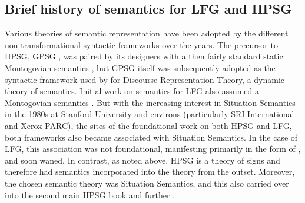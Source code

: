 \subsection{Brief history of semantics for LFG and HPSG}
\label{sec:background}

%
%
%

Various theories of semantic representation have been adopted by the different non-transformational syntactic frameworks over the years.  
The precursor to HPSG, GPSG \citep{GKPS85a}, was paired by its designers with a then fairly standard static Montogovian semantics \citep{Montague73a-u}, but GPSG itself was subsequently adopted as the syntactic framework used by \citet[9]{kamp;reyle93} for Discourse Representation Theory, a dynamic theory of semantics.  Initial work on semantics for LFG also assumed a Montogovian semantics \citep{halvorsen83,halvorsen;kaplan88}.  But with the increasing interest in Situation Semantics \citep{barwise;perry83} in the 1980s at Stanford University and environs (particularly SRI International and Xerox PARC), the sites of the foundational work on both HPSG and LFG, both frameworks also became associated with Situation Semantics.  In the case of LFG, this association was not foundational, manifesting primarily in the form of \citet{fenstad;ea87}, and soon waned. In contrast, as noted above, HPSG is a theory of signs and therefore had semantics incorporated into the theory from the outset.  Moreover, the chosen semantic theory was Situation Semantics, and this also carried over into the second main HPSG book \citep{ps2} and further \citep{ginzburg;sag00}.

